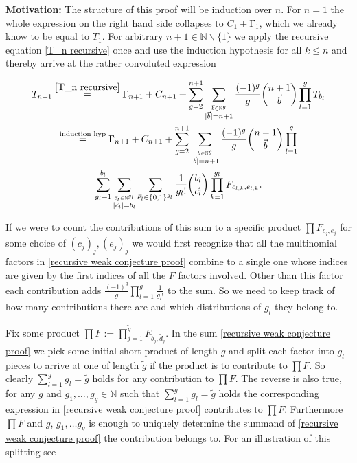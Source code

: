 \documentclass[b5paper,draft,openbib,12pt]{memoir}
\begin{document}
\textbf{Motivation:} The structure of this proof will be induction over \(n\). For \(n=1\) the whole expression
on the right hand side collapses to \(C_1 + \mathrm\Gamma_1\), which we already know to be equal to \(T_1\). For
arbitrary \(n+1\in\mathbb{N}\backslash\{1\}\) we apply the recursive equation \eqref{T_n recursive}
once and use the induction hypothesis for all \(k\le n\) and thereby arrive at the rather convoluted 
expression

\begin{multline}\label{recursive weak conjecture proof}
T_{n+1} \stackrel{\eqref{T_n recursive}}{=} 
\mathrm\Gamma_{n+1} + C_{n+1}+ \sum_{g=2}^{n+1} \sum_{\stackrel{\vec{b}\in\mathbb{N}^g}{|\vec{b}|=n+1}} 
\frac{(-1)^g}{g} \binom{n+1}{\vec{b}} \prod_{l=1}^g T_{b_l}\\
\stackrel{\text{induction hyp}}{=} \mathrm\Gamma_{n+1} + C_{n+1}+ \sum_{g=2}^{n+1} \sum_{\stackrel{\vec{b}\in\mathbb{N}^g}{|\vec{b}|=n+1}} 
\frac{(-1)^g}{g} \binom{n+1}{\vec{b}} \prod_{l=1}^g \\
\sum_{g_l=1}^{b_l} \sum_{\stackrel{\vec{c}_l \in\mathbb{N}^{g_l}}{|\vec{c}_l|=b_l}} \sum_{\vec{e}_l \in \{0,1\}^{g_l}}
\frac{1}{g_l!} \binom{b_l}{\vec{c}_l} \prod_{k=1}^{g_l} F_{c_{l,k},e_{l,k}}.
\end{multline}

If we were to count the contributions of this sum to a specific product \(\prod F_{c_j,e_j}\) for some choice of 
\((c_j)_j, (e_j)_j\) we would first recognize that all the multinomial factors in \eqref{recursive weak conjecture proof}
combine to a single one whose indices are given by the first indices of all the \(F\) factors involved.
Other than this factor each contribution adds \(\frac{(-1)^g}{g} \prod_{l=1}^g \frac{1}{g_l!}\) to the sum. So we 
need to keep track of how many contributions there are and which distributions of \(g_l\) they belong to. 

Fix some product \(\prod F :=\prod_{j=1}^{\tilde{g}} F_{\tilde{b}_j,\tilde{d}_j}\). In the sum 
\eqref{recursive weak conjecture proof} we pick some initial short product of length \(g\) and split each
factor into \(g_l\) pieces to arrive at one of length \(\tilde{g}\) if the product is to contribute to
\(\prod F\). So clearly \(\sum_{l=1}^g g_l = \tilde{g}\) holds for any contribution to \(\prod F\). 
The reverse is also true, for any
\(g\) and \(g_1, \dots, g_g\in\mathbb{N}\) such that \(\sum_{l=1}^g g_l=\tilde{g}\) holds
the corresponding expression in \eqref{recursive weak conjecture proof} contributes to 
\(\prod F\). Furthermore \(\prod F\) and \(g\), \(g_1,\dots g_g\) is enough to uniquely
determine the summand of \eqref{recursive weak conjecture proof} the contribution
belongs to. For an illustration of this splitting see
\end{document}
